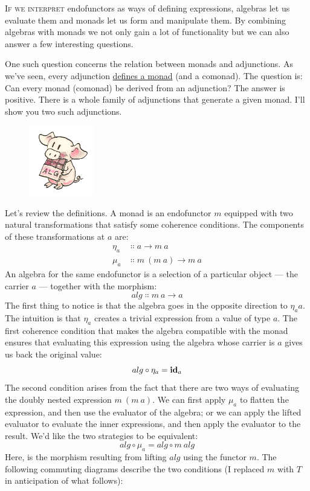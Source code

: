 
\lettrine[lhang=0.17]{I}{f we interpret} endofunctors as ways of defining expressions, algebras
let us evaluate them and monads let us form and manipulate them. By
combining algebras with monads we not only gain a lot of functionality
but we can also answer a few interesting questions.

One such question concerns the relation between monads and adjunctions.
As we've seen, every adjunction \hyperref[monads-categorically]{defines
a monad} (and a comonad). The question is: Can every monad (comonad) be
derived from an adjunction? The answer is positive. There is a whole
family of adjunctions that generate a given monad. I'll show you two
such adjunctions.

\begin{figure}[H]
\centering
\includegraphics[width=0.25\textwidth]{images/pigalg.png}
\end{figure}

\noindent
Let's review the definitions. A monad is an endofunctor $m$
equipped with two natural transformations that satisfy some coherence
conditions. The components of these transformations at $a$ are:
\begin{align*}
\eta_a &\Colon a \to m\ a \\
\mu_a &\Colon m\ (m\ a) \to m\ a
\end{align*}
An algebra for the same endofunctor is a selection of a particular
object --- the carrier $a$ --- together with the morphism:
\[alg \Colon m\ a \to a\]
The first thing to notice is that the algebra goes in the opposite
direction to $\eta_aa$. The intuition is that $\eta_a$ creates a
trivial expression from a value of type $a$. The first coherence
condition that makes the algebra compatible with the monad ensures that
evaluating this expression using the algebra whose carrier is $a$
gives us back the original value:
\[alg \circ \eta_a = \mathbf{id}_a\]
The second condition arises from the fact that there are two ways of
evaluating the doubly nested expression $m\ (m\ a)$. We can first
apply $\mu_a$ to flatten the expression, and then use the evaluator
of the algebra; or we can apply the lifted evaluator to evaluate the
inner expressions, and then apply the evaluator to the result. We'd like
the two strategies to be equivalent:
\[alg \circ \mu_a = alg \circ m\ alg\]
Here,  is the morphism resulting from lifting
$alg$ using the functor $m$. The following commuting
diagrams describe the two conditions (I replaced $m$ with
$T$ in anticipation of what follows):

